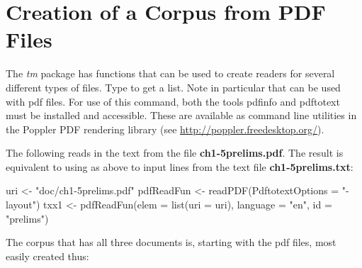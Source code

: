 \section{Creation of a Corpus from PDF Files}

The {\em tm} package has functions that can be used to create readers
for several different types of files.  Type  to get
a list.  Note in particular  that can be used with pdf
files.  For use of this command, both the tools pdfinfo and pdftotext
must be installed and accessible.  These are available as command line
utilities in the Poppler PDF rendering library (see
\url{http://poppler.freedesktop.org/}).

The following reads in the text from the file {\bf ch1-5prelims.pdf}.
The result is equivalent to using  as above to
input lines from the text file {\bf ch1-5prelims.txt}:
\begin{Schunk}
\begin{Sinput}
uri <- "doc/ch1-5prelims.pdf"
pdfReadFun <- readPDF(PdftotextOptions = "-layout")
txx1 <- pdfReadFun(elem = list(uri = uri),
                   language = "en", id = "prelims")
\end{Sinput}
\end{Schunk}

The corpus that has all three documents is, starting with the
pdf files, most easily created thus:
\begin{fullwidth}
\begin{Schunk}
\end{Schunk}
\end{fullwidth}

